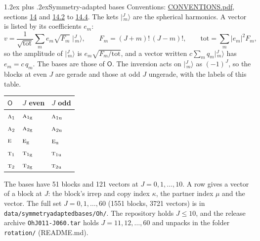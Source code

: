 \documentclass[10pt,a4paper]{article}
\makeatletter
\renewcommand\section{\@startsection{section}{1}{\z@}{-3ex plus -1ex minus -.2ex}%
  {1.2ex plus .2ex}{\normalfont\large\sffamily\bfseries\color{parttitle}}}
\numberwithin{equation}{section}
\newcommand{\grp}[1]{\mathsf{#1}}
\newcommand{\irr}[1]{\text{\normalfont\scshape #1}}
\newcommand{\ptag}[1]{\mathrm{#1}}
\newcommand{\mult}{\kappa}
\newcommand{\intx}{\mu}
\newcommand{\jm}[2]{\bigl\lvert{}^{#1}_{\,#2}\bigr\rangle}
\makeatother
\begin{document}
\section{Symmetry-adapted bases}\label{s:bases}
Conventions: \href{../../CONVENTIONS.pdf}{CONVENTIONS.pdf}, sections \href{../../CONVENTIONS.pdf\#conv.14}{14} and \href{../../CONVENTIONS.pdf\#conv.14.2}{14.2} to \href{../../CONVENTIONS.pdf\#conv.14.4}{14.4}.
\leavevmode\label{n:index.m}\label{n:vector.ket}The kets $\jm{J}{m}$ are the spherical harmonics. \label{n:index.ketcoefficient}\label{n:vector.basis.symmetry}\label{n:index.ketweight}\label{n:index.total}A vector is listed by its coefficients $e_m$:
\begin{equation}\label{e:ket}v = \frac{1}{\sqrt{\mathrm{tot}}}\sum_m e_m\sqrt{F_m}\;\jm{J}{m},\qquad F_m = (J+m)!\,(J-m)!,\qquad \mathrm{tot} = \sum_m |e_m|^2F_m,\end{equation}
\leavevmode\label{n:index.factor.c}\label{n:index.multiplicity.copies}so the amplitude of $\jm{J}{m}$ is $e_m\sqrt{F_m/\mathrm{tot}}$, and a vector written $c\sum_m q_m\jm{J}{m}$ has $e_m = c\,q_m$.
The bases are those of \href{O.pdf}{$\grp{O}$}. The inversion acts on $\jm{J}{m}$ as $(-1)^J$, so the blocks at even $J$ are gerade and those at odd $J$ ungerade, with the labels of this table.
\begin{center}\begin{tabular}{@{}lll@{}}\toprule
\href{O.pdf}{$\grp{O}$} & $J$ even & $J$ odd\\\midrule
$\irr{a}_{1}$ & $\irr{a}_{1\ptag{g}}$ & $\irr{a}_{1\ptag{u}}$\\
$\irr{a}_{2}$ & $\irr{a}_{2\ptag{g}}$ & $\irr{a}_{2\ptag{u}}$\\
$\irr{e}$ & $\irr{e}_{\ptag{g}}$ & $\irr{e}_{\ptag{u}}$\\
$\irr{t}_{1}$ & $\irr{t}_{1\ptag{g}}$ & $\irr{t}_{1\ptag{u}}$\\
$\irr{t}_{2}$ & $\irr{t}_{2\ptag{g}}$ & $\irr{t}_{2\ptag{u}}$\\
\bottomrule\end{tabular}\end{center}
The bases have 51 blocks and 121 vectors at $J = 0, 1, \dots, 10$. \label{n:head.vector}A row gives a vector of a block at $J$: the block's irrep and copy index $\mult$, the partner index $\intx$ and the vector. The full set $J = 0, 1, \dots, 60$ (1551 blocks, 3721 vectors) is in \texttt{data/symmetryadaptedbases/Oh/}. The repository holds $J \le 10$, and the release archive \texttt{OhJ011-J060.tar} holds $J = 11, 12, \dots, 60$ and unpacks in the folder \texttt{rotation/} (README.md).
\end{document}
